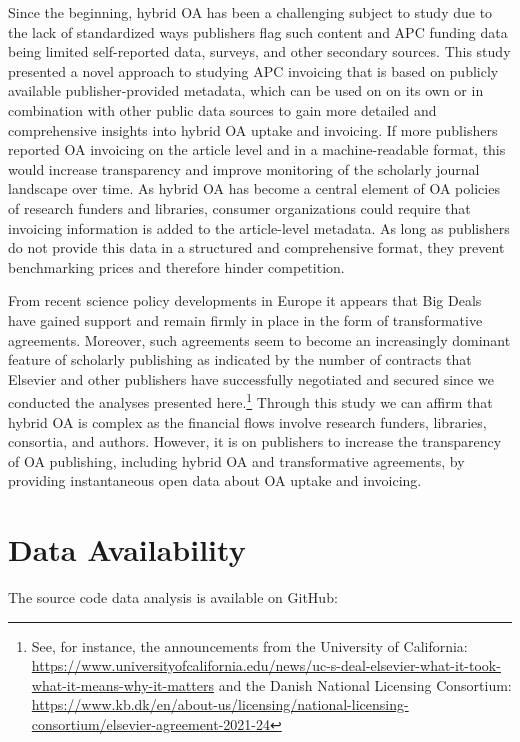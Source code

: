 \documentclass[a4paper,man,floatsintext,longtable,noextraspace,12pt]{apa6}
\begin{document}
Since the beginning, hybrid OA has been a challenging subject to study
due to the lack of standardized ways publishers flag such content and
APC funding data being limited self-reported data, surveys, and other
secondary sources. This study presented a novel approach to studying APC
invoicing that is based on publicly available publisher-provided
metadata, which can be used on on its own or in combination with other
public data sources to gain more detailed and comprehensive insights
into hybrid OA uptake and invoicing. If more publishers reported OA
invoicing on the article level and in a machine-readable format, this
would increase transparency and improve monitoring of the scholarly
journal landscape over time. As hybrid OA has become a central element
of OA policies of research funders and libraries, consumer organizations
could require that invoicing information is added to the article-level
metadata. As long as publishers do not provide this data in a structured
and comprehensive format, they prevent benchmarking prices and therefore
hinder competition.

From recent science policy developments in Europe it appears that Big
Deals have gained support and remain firmly in place in the form of
transformative agreements. Moreover, such agreements seem to become an
increasingly dominant feature of scholarly publishing as indicated by
the number of contracts that Elsevier and other publishers have
successfully negotiated and secured since we conducted the analyses
presented here.\footnote{See, for instance, the announcements from the
  University of California:
  \url{https://www.universityofcalifornia.edu/news/uc-s-deal-elsevier-what-it-took-what-it-means-why-it-matters}
  and the Danish National Licensing Consortium:
  \url{https://www.kb.dk/en/about-us/licensing/national-licensing-consortium/elsevier-agreement-2021-24}}
Through this study we can affirm that hybrid OA is complex as the
financial flows involve research funders, libraries, consortia, and
authors. However, it is on publishers to increase the transparency of OA
publishing, including hybrid OA and transformative agreements, by
providing instantaneous open data about OA uptake and invoicing.

\hypertarget{data-availability}{%
\section{Data Availability}\label{data-availability}}

The source code data analysis is available on GitHub:
\end{document}
